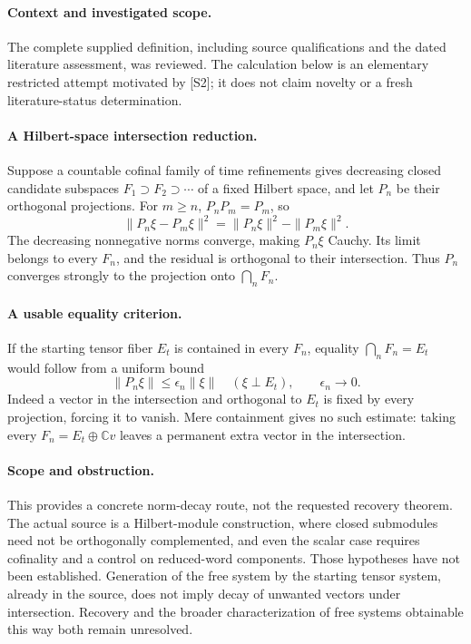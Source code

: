 \documentclass[11pt]{article}
\begin{document}
\paragraph{Context and investigated scope.} The complete supplied definition, including source qualifications and the dated literature assessment, was reviewed. The calculation below is an elementary restricted attempt motivated by [S2]; it does not claim novelty or a fresh literature-status determination.

\paragraph{A Hilbert-space intersection reduction.} Suppose a countable cofinal family of time refinements gives decreasing closed candidate subspaces $F_1\supset F_2\supset\cdots$ of a fixed Hilbert space, and let $P_n$ be their orthogonal projections. For $m\geq n$, $P_nP_m=P_m$, so
\[
 \|P_n\xi-P_m\xi\|^2=\|P_n\xi\|^2-\|P_m\xi\|^2.
\]
The decreasing nonnegative norms converge, making $P_n\xi$ Cauchy. Its limit belongs to every $F_n$, and the residual is orthogonal to their intersection. Thus $P_n$ converges strongly to the projection onto $\bigcap_nF_n$.

\paragraph{A usable equality criterion.} If the starting tensor fiber $E_t$ is contained in every $F_n$, equality $\bigcap_nF_n=E_t$ would follow from a uniform bound
\[
 \|P_n\xi\|\leq\epsilon_n\|\xi\|\quad(\xi\perp E_t),\qquad\epsilon_n\to0.
\]
Indeed a vector in the intersection and orthogonal to $E_t$ is fixed by every projection, forcing it to vanish. Mere containment gives no such estimate: taking every $F_n=E_t\oplus\mathbb C v$ leaves a permanent extra vector in the intersection.

\paragraph{Scope and obstruction.} This provides a concrete norm-decay route, not the requested recovery theorem. The actual source is a Hilbert-module construction, where closed submodules need not be orthogonally complemented, and even the scalar case requires cofinality and a control on reduced-word components. Those hypotheses have not been established. Generation of the free system by the starting tensor system, already in the source, does not imply decay of unwanted vectors under intersection. Recovery and the broader characterization of free systems obtainable this way both remain unresolved.
\end{document}
